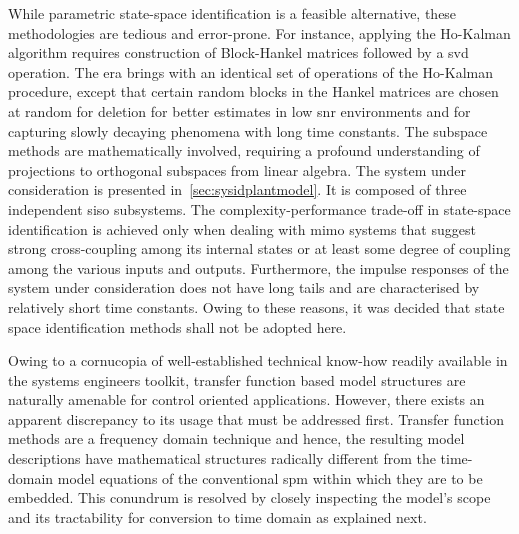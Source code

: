 While  parametric state-space  identification is  a feasible  alternative, these
methodologies  are   tedious  and   error-prone.  For  instance,   applying  the
Ho-Kalman  algorithm requires  construction  of  Block-Hankel matrices  followed
by  a  \gls{svd} operation.  The  \gls{era}  brings  with  an identical  set  of
operations  of  the  Ho-Kalman  procedure, except  that  certain  random  blocks
in  the  Hankel   matrices  are  chosen  at  random  for   deletion  for  better
estimates  in  low \gls{snr}  environments  and  for capturing  slowly  decaying
phenomena  with long  time constants.  The subspace  methods are  mathematically
involved,  requiring  a  profound  understanding of  projections  to  orthogonal
subspaces  from linear  algebra.  The system  under  consideration is  presented
in~\cref{sec:sysidplantmodel}.  It   is  composed  of   three  independent
\gls{siso}  subsystems.  The  complexity-performance  trade-off  in  state-space
identification  is  achieved only  when  dealing  with \gls{mimo}  systems  that
suggest strong cross-coupling among its internal  states or at least some degree
of  coupling among  the various  inputs  and outputs.  Furthermore, the  impulse
responses of  the system under  consideration does not  have long tails  and are
characterised by relatively short time constants. Owing to these reasons, it was
decided that state space identification methods shall not be adopted here.

Owing to a  cornucopia of well-established technical  know-how readily available
in the systems  engineers toolkit, transfer function based  model structures are
naturally amenable for  control oriented applications. However,  there exists an
apparent  discrepancy  to its  usage  that  must  be addressed  first.  Transfer
function  methods are  a frequency  domain  technique and  hence, the  resulting
model  descriptions have  mathematical structures  radically different  from the
time-domain model equations of the  conventional \gls{spm} within which they are
to be  embedded. This conundrum  is resolved  by closely inspecting  the model's
scope and its tractability for conversion to time domain as explained next.

